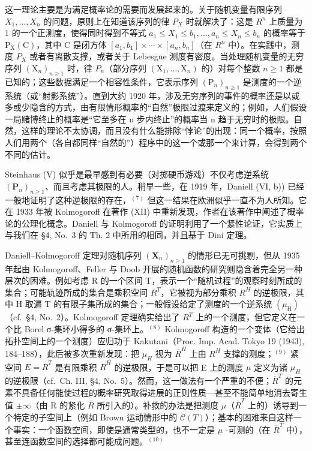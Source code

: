 
这一理论主要是为满足概率论的需要而发展起来的。关于随机变量有限序列 \(X_{1},\ldots,X_{n}\) 的问题，原则上在知道该序列的律 \(P_{X}\) 时就解决了：这是 \(R^{n}\) 上质量为 1 的一个正测度，使得同时得到不等式 \(a_{1}\leqslant X_{1}\leqslant b_{1},\ldots,a_{n}\leqslant X_{n}\leqslant b_{n}\) 的概率等于 \(\mathrm{P}_{\mathrm{X}}(\mathrm{C})\)，其中 C 是闭方体 \([a_{1},b_{1}]\times\cdots\times[a_{n},b_{n}]\)（在 \(R^{n}\) 中）。在实践中，测度 \(P_{X}\) 或者有离散支撑，或者关于 Lebesgue 测度有密度。当处理随机变量的无穷序列 \((\mathrm{X}_{n})_{n\geqslant1}\) 时，律 \(P_{n}\)（部分序列 \((\mathrm{X}_{1},\ldots,\mathrm{X}_{n})\) 的）对每个整数 \(n\geqslant1\) 都是已知的；这些数据满足一个相容性条件，它表示序列 \((\mathrm{P}_{n})_{n\geqslant1}\) 是测度的一个逆系统（或“射影系统”）。直到大约 1920 年，涉及无穷序列的事件的概率还是以或多或少隐含的方式，由有限情形概率的“自然”极限过渡来定义的；例如，人们假设一局赌博终止的概率是“它至多在 n 步内终止”的概率当 n 趋于无穷时的极限。自然，这样的理论不太协调，而且没有什么能排除“悖论”的出现：同一个概率，按照人们用两个（各自都同样“自然的”）程序中的这一个或那一个来计算，会得到两个不同的估计。

Steinhaus (V) 似乎是最早感到有必要（对掷硬币游戏）不仅考虑逆系统 \((\mathbf{P}_{n})_{n\geqslant1}\)、而且考虑其极限的人。稍早一些，在 1919 年，Daniell (VI, b)) 已经一般地证明了这种逆极限的存在，\(^{(7)}\) 但这一结果在欧洲似乎一直不为人所知。它在 1933 年被 Kolmogoroff 在著作 (XII) 中重新发现，作者在该著作中阐述了概率论的公理化概念。Daniell 与 Kolmogoroff 的证明利用了一个紧性论证，它实质上与我们在 §4, No.~3 的 Th. 2 中所用的相同，并且基于 Dini 定理。

Daniell--Kolmogoroff 定理对随机序列 \((\mathbf{X}_{n})_{n\geqslant1}\) 的情形已无可挑剔，但从 1935 年起由 Kolmogoroff、Feller 与 Doob 开展的随机函数的研究则隐含着完全另一种层次的困难。例如考虑 R 的一个区间 T，表示一个“随机过程”的观察时刻所成的集合；可能轨迹所成的集合是乘积空间 \(R^{T}\)，它被视为部分乘积 \(R^{H}\) 的逆极限，其中 H 取遍 T 的有限子集所成的集合；一般假设给定了测度的一个逆系统 \((\mu_{\mathrm{H}})\)（cf.~§4, No.~2）。Kolmogoroff 定理确实给出了 \(R^{T}\) 上的一个测度，但它定义在一个比 Borel σ-集环小得多的 σ-集环上。\(^{(8)}\) Kolmogoroff 构造的一个变体（它给出拓扑空间上的一个测度）应归功于 Kakutani（Proc. Imp. Acad. Tokyo 19 (1943), 184--188），此后被多次重新发现：把 \(\mu_{H}\) 视为 \(\overline{R}^{H}\) 上由 \(R^{H}\) 支撑的测度；\(^{(9)}\) 紧空间 \(E = \overline{R}^{T}\) 是有限乘积 \(\overline{R}^{H}\) 的逆极限，于是可以把 E 上的测度 \(\mu\) 定义为诸 \(\mu_{H}\) 的逆极限（cf.~Ch. III, §4, No.~5）。然而，这一做法有一个严重的不便；\(\overline{R}^{T}\) 的元素不具备任何能使过程的概率研究取得进展的正则性质---甚至不能简单地消去寄生值 \(\pm\infty\)（由 R 的紧化 \(\overline{R}\) 所引入的）。补救的办法是把测度 \(\mu\)（\(\overline{R}^{T}\) 上的）诱导到一个特定的子空间上（例如 Brown 运动情形中的 \(\mathcal{C}(T)\)）；基本的困难来自这样一个事实：一个函数空间，即使是通常类型的，也不一定是 \(\mu\) -可测的（在 \(\overline{R}^{T}\) 中），甚至连函数空间的选择都可能成问题。\(^{(10)}\)

